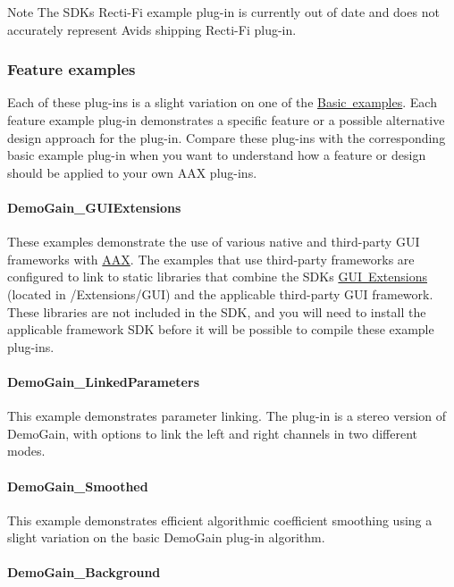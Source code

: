 \begin{DoxyNote}{Note}
The S\+DK\textquotesingle{}s Recti-\/\+Fi example plug-\/in is currently out of date and does not accurately represent Avid\textquotesingle{}s shipping Recti-\/\+Fi plug-\/in.
\end{DoxyNote}
\hypertarget{a00848_feature_examples}{}\subsubsection{Feature examples}\label{a00848_feature_examples}
Each of these plug-\/ins is a slight variation on one of the \mbox{\hyperlink{a00848_basic_examples}{Basic examples}}. Each feature example plug-\/in demonstrates a specific feature or a possible alternative design approach for the plug-\/in. Compare these plug-\/ins with the corresponding basic example plug-\/in when you want to understand how a feature or design should be applied to your own A\+AX plug-\/ins.\hypertarget{a00848_DemoGain_GUIExtensions}{}\paragraph{Demo\+Gain\+\_\+\+G\+U\+I\+Extensions}\label{a00848_DemoGain_GUIExtensions}
These examples demonstrate the use of various native and third-\/party G\+UI frameworks with \mbox{\hyperlink{a00852}{A\+AX}}. The examples that use third-\/party frameworks are configured to link to static libraries that combine the S\+DK\textquotesingle{}s \mbox{\hyperlink{a00838}{G\+UI Extensions}} (located in /\+Extensions/\+G\+UI) and the applicable third-\/party G\+UI framework. These libraries are not included in the S\+DK, and you will need to install the applicable framework S\+DK before it will be possible to compile these example plug-\/ins.\hypertarget{a00848_DemoGain_LinkedParameters}{}\paragraph{Demo\+Gain\+\_\+\+Linked\+Parameters}\label{a00848_DemoGain_LinkedParameters}
This example demonstrates parameter linking. The plug-\/in is a stereo version of Demo\+Gain, with options to link the left and right channels in two different modes.\hypertarget{a00848_DemoGain_Smoothed}{}\paragraph{Demo\+Gain\+\_\+\+Smoothed}\label{a00848_DemoGain_Smoothed}
This example demonstrates efficient algorithmic coefficient smoothing using a slight variation on the basic Demo\+Gain plug-\/in algorithm.\hypertarget{a00848_DemoGain_Background}{}\paragraph{Demo\+Gain\+\_\+\+Background}\label{a00848_DemoGain_Background}

